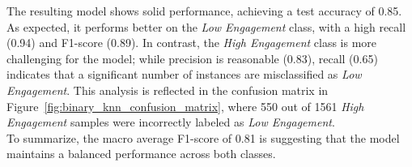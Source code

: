 The resulting model shows solid performance, achieving a test accuracy of 0.85. As expected, it performs better on the \textit{Low Engagement} class, with a high recall (0.94) and F1-score (0.89). 
In contrast, the \textit{High Engagement} class is more challenging for the model; while precision is reasonable (0.83), recall (0.65) indicates that a significant number of instances are misclassified as 
\textit{Low Engagement}.
This analysis is reflected in the confusion matrix in Figure~\ref{fig:binary_knn_confusion_matrix}, where 550 out of 1561 \textit{High Engagement} samples were incorrectly labeled as \textit{Low Engagement}.\\

To summarize, the macro average F1-score of 0.81 is suggesting that the model maintains a balanced performance across both classes.



